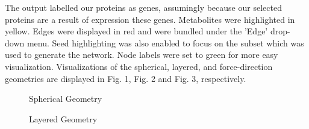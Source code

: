 \documentclass[letterpaper, 10 pt, conference]{ieeeconf}  %
\begin{document}
The output labelled our proteins as genes, assumingly because our selected proteins are a result of expression these genes. Metabolites were highlighted in yellow. Edges were displayed in red and were bundled under the 'Edge' drop-down menu. Seed highlighting was also enabled to focus on the subset which was used to generate the network. Node labels were set to green for more easy visualization. Visualizations of the spherical, layered, and force-direction geometries are displayed in Fig. 1, Fig. 2 and Fig. 3, respectively.

\begin{figure}[h!]
    \centering

    \caption{Spherical Geometry}

\end{figure}


\begin{figure}[h!]
    \centering

    \caption{Layered Geometry}
\end{figure}
\end{document}
